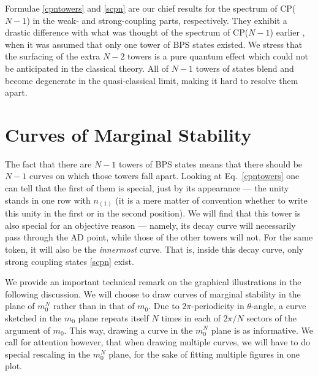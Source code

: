 \documentclass[epsfig,12pt]{article}
\begin{document}
	Formulae \eqref{cpntowers} and \eqref{scpn} are our chief results for the spectrum of CP($N-1$) 
	in the weak- and strong-coupling parts, respectively.
	They exhibit a drastic difference with what was thought of the spectrum of CP($N-1$) earlier \cite{Dor},
	when it was assumed that only one tower of BPS states existed. 
	We stress that the surfacing of the extra $ N - 2 $ towers is a pure quantum effect which could not
	be anticipated in the classical theory.
	All of $ N - 1 $ towers of states blend and become degenerate in the quasi-classical limit, making it
	hard to resolve them apart.



\section{Curves of Marginal Stability}
\label{curves}

	The fact that there are $ N - 1 $ towers of BPS states means that there should be 
	$ N - 1 $ curves on which those towers fall apart. 
	Looking at Eq.~\eqref{cpntowers} one can tell that the first of them is special,
	just by its appearance ---
	the unity stands in one row with $ n_{(1)} $ (it is a mere matter of convention
	whether to write this unity in the first or in the second position).
	We will find that this tower is also special for an objective reason --- namely,
	its decay curve will necessarily pass through the AD point, while those of the other towers will not.
	For the same token, it will also be the {\it innermost} curve.
	That is, inside this decay curve, only strong coupling states \eqref{scpn} exist.

	We provide an important technical remark on the graphical illustrations in the following discussion.
	We will choose to draw curves of marginal stability in the plane of $ m_0^N $ rather
	than in that of $ m_0 $.
	Due to $ 2\pi $-periodicity in $ \theta $-angle, a curve sketched in the $ m_0 $ plane 
	repeats itself $ N $ times in each of $ 2 \pi / N $ sectors of the argument of $ m_0 $.
	This way, drawing a curve in the $ m_0^N $ plane is as informative. 
	We call for attention however, that when drawing multiple curves, we will have 
	to do special rescaling in the $ m_0^N $ plane, for the sake of fitting multiple figures in one plot.
\end{document}
